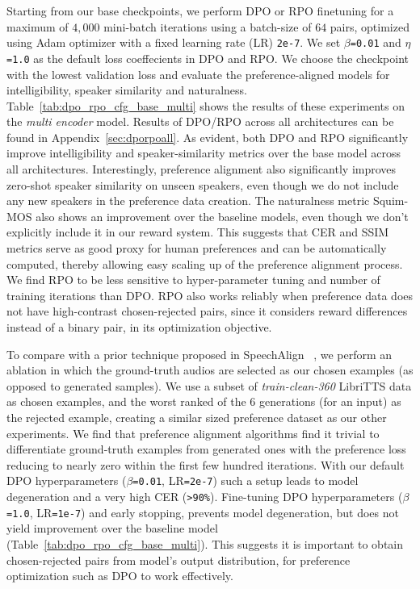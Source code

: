 Starting from our base checkpoints, we perform DPO or RPO finetuning for a maximum of $4{,}000$ mini-batch iterations using a batch-size of $64$ pairs, optimized using Adam optimizer with a fixed learning rate (LR) \texttt{2e-7}. We set $\beta$\texttt{=0.01} and $\eta$\texttt{=1.0} as the default loss coeffecients in DPO and RPO. We choose the checkpoint with the lowest validation loss and evaluate the preference-aligned models for intelligibility, speaker similarity  and naturalness. Table~\ref{tab:dpo_rpo_cfg_base_multi} shows the results of these experiments on the \textit{multi encoder} model. Results of DPO/RPO across all architectures can be found in Appendix~\ref{sec:dporpoall}.
As evident, both DPO and RPO significantly improve intelligibility and speaker-similarity metrics over the base model across all architectures. Interestingly, preference alignment also significantly improves zero-shot speaker similarity on unseen speakers, even though we do not include any new speakers in the preference data creation. The naturalness metric Squim-MOS also shows an improvement over the baseline models, even though we don't explicitly include it in our reward system. 
This suggests that CER and SSIM metrics serve as good proxy for human preferences and can be automatically computed, thereby allowing easy scaling up of the preference alignment process.
We find RPO to be less sensitive to hyper-parameter tuning and number of training iterations than DPO. 
RPO also works reliably when preference data does not have high-contrast chosen-rejected pairs, since it considers reward differences instead of a binary pair, in its optimization objective.

To compare with a prior technique proposed in SpeechAlign ~\cite{zhang2024speechalign}, we perform an ablation in which the ground-truth audios are selected as our chosen examples (as opposed to generated samples).  
We use a subset of \textit{train-clean-360} LibriTTS data as chosen examples, and the worst ranked of the $6$ generations (for an input) as the rejected example, creating a similar sized preference dataset as our other experiments.
We find that preference alignment algorithms find it trivial to differentiate ground-truth examples from generated ones with the preference loss reducing to nearly zero within the first few hundred iterations.
With our default DPO hyperparameters ($\beta$\texttt{=0.01}, LR\texttt{=2e-7}) such a setup leads to model degeneration and a very high CER (\texttt{>90\%}). 
Fine-tuning DPO hyperparameters ($\beta$\texttt{=1.0}, LR\texttt{=1e-7}) and early stopping, 
prevents model degeneration, but does not yield improvement over the baseline model (Table~\ref{tab:dpo_rpo_cfg_base_multi}). This suggests it is important to obtain chosen-rejected pairs from model's output distribution, for preference optimization such as DPO to work effectively.

